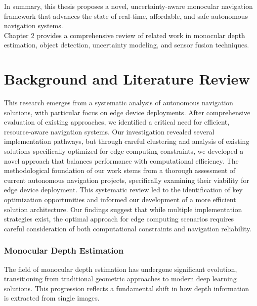 \documentclass[12pt,oneside]{book}
\begin{document}
In summary, this thesis proposes a novel, uncertainty-aware monocular navigation framework that advances the state of real-time, affordable, and safe autonomous navigation systems.
\vspace{1cm}\\
Chapter 2 provides a comprehensive review of related work in monocular depth estimation, object detection, uncertainty modeling, and sensor fusion techniques.
\let\section\oldsection




\chapter{Background and Literature Review}
This research emerges from a systematic analysis of autonomous navigation solutions, with particular focus on edge device deployments. After comprehensive evaluation of existing approaches, we identified a critical need for efficient, resource-aware navigation systems. Our investigation revealed several implementation pathways, but through careful clustering and analysis of existing solutions specifically optimized for edge computing constraints, we developed a novel approach that balances performance with computational efficiency.
The methodological foundation of our work stems from a thorough assessment of current autonomous navigation projects, specifically examining their viability for edge device deployment. This systematic review led to the identification of key optimization opportunities and informed our development of a more efficient solution architecture. Our findings suggest that while multiple implementation strategies exist, the optimal approach for edge computing scenarios requires careful consideration of both computational constraints and navigation reliability.

\subsection{Monocular Depth Estimation}

The field of monocular depth estimation has undergone significant evolution, transitioning from traditional geometric approaches to modern deep learning solutions. This progression reflects a fundamental shift in how depth information is extracted from single images.
\end{document}
